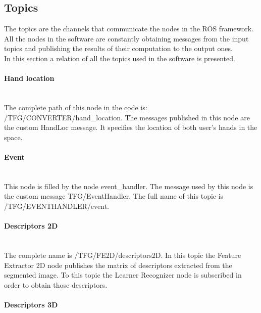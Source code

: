 \subsection{Topics}
\label{topics}

	The topics are the channels that communicate the nodes in the ROS framework. All the nodes in the software are constantly obtaining messages from the input topics and publishing the results of their computation to the output ones. 
	\\

	In this section a relation of all the topics used in the software is presented. 


	\paragraph{Hand location}\mbox{} \\

	The complete path of this node in the code is: /TFG/CONVERTER/hand\_location. The messages published in this node are the custom HandLoc message. It specifies the location of both user's hands in the space. 
	\\

	\paragraph{Event}\mbox{} \\

	This node is filled by the node event\_handler. The message used by this node is the custom message TFG/EventHandler. The full name of this topic is /TFG/EVENTHANDLER/event. 

	\paragraph{Descriptors 2D}\mbox{} \\

		The complete name is /TFG/FE2D/descriptors2D. In this topic the Feature Extractor 2D node publishes the matrix of descriptors extracted from the segmented image. To this topic the Learner Recognizer node is subscribed in order to obtain those descriptors.  \\

	\paragraph{Descriptors 3D}\mbox{} \\

